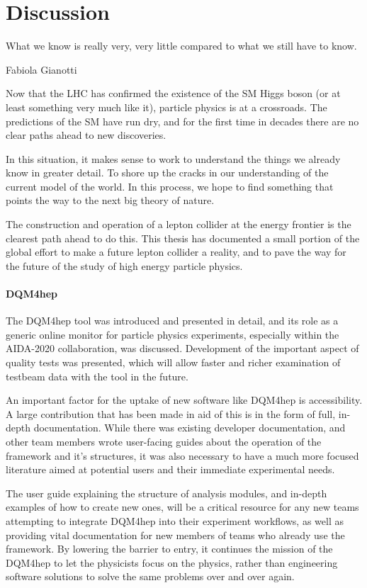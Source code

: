 \chapter{Discussion}
\label{chapter:discussion}

\epigraph{What we know is really very, very little compared to what we still have to know.}{Fabiola Gianotti}

Now that the \acrlong{LHC} has confirmed the existence of the \acrlong{SM} Higgs boson (or at least something very much like it), particle physics is at a crossroads. The predictions of the \acrlong{SM} have run dry, and for the first time in decades there are no clear paths ahead to new discoveries. 

In this situation, it makes sense to work to understand the things we already know in greater detail. To shore up the cracks in our understanding of the current model of the world. In this process, we hope to find something that points the way to the next big theory of nature.

The construction and operation of a lepton collider at the energy frontier is the clearest path ahead to do this. This thesis has documented a small portion of the global effort to make a future lepton collider a reality, and to pave the way for the future of the study of high energy particle physics.

\subsubsection*{DQM4hep}
The \acrfull{DQM4hep} tool was introduced and presented in detail, and its role as a generic online monitor for particle physics experiments, especially within the AIDA-2020 collaboration, was discussed. Development of the important aspect of quality tests was presented, which will allow faster and richer examination of testbeam data with the tool in the future.

An important factor for the uptake of new software like \acrshort{DQM4hep} is accessibility. A large contribution that has been made in aid of this is in the form of full, in-depth documentation. While there was existing developer documentation, and other team members wrote user-facing guides about the operation of the framework and it's structures, it was also necessary to have a much more focused literature aimed at potential users and their immediate experimental needs.

The user guide explaining the structure of analysis modules, and in-depth examples of how to create new ones, will be a critical resource for any new teams attempting to integrate \acrshort{DQM4hep} into their experiment workflows, as well as providing vital documentation for new members of teams who already use the framework. By lowering the barrier to entry, it continues the mission of the \acrshort{DQM4hep} to let the physicists focus on the physics, rather than engineering software solutions to solve the same problems over and over again.

